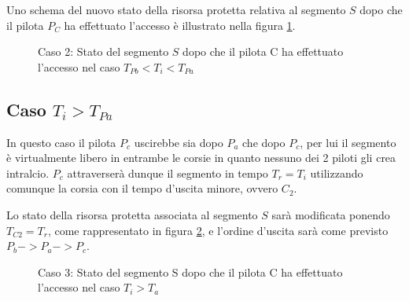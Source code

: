 \documentclass[a4paper,11pt, twoside, openright]{book}
\begin{document}
	Uno schema del nuovo stato della risorsa protetta relativa al segmento $S$ dopo che il
	pilota $P_C$ ha effettuato l'accesso è illustrato nella figura 
	\ref{fgr:AccessoSegmentiCaso2}.

	\begin{figure}[ht]
	  \centering
	  \caption{Caso 2: Stato del segmento $S$ dopo che il pilota C ha effettuato l'accesso nel caso $T_{Pb} < T_i < T_{Pa}$}
	  \label{fgr:AccessoSegmentiCaso2}
	\end{figure}
      
      \subsection{Caso $T_i > T_{Pa}$}
	In questo caso il pilota $P_c$ uscirebbe sia dopo $P_a$ che dopo $P_c$, per lui il segmento
	è virtualmente libero in entrambe le corsie in quanto nessuno dei 2 piloti gli crea intralcio. $P_c$ attraverserà
	dunque il segmento in tempo $T_r = T_i$ utilizzando comunque la corsia con il tempo d'uscita minore,
	ovvero $C_2$.
	
	Lo stato della risorsa protetta associata al segmento $S$ sarà modificata ponendo $T_{C2} = T_r$,
	come rappresentato in figura \ref{fgr:AccessoSegmentiCaso3}, e l'ordine d'uscita sarà come previsto
	$P_b -> P_a -> P_c$.
      
	\begin{figure}[ht]
	  \centering
	  \caption{Caso 3: Stato del segmento S dopo che il pilota C ha effettuato l'accesso nel caso $T_i > T_a$}
	  \label{fgr:AccessoSegmentiCaso3}
	\end{figure}
	
\end{document}
